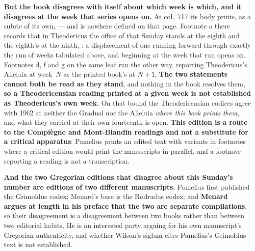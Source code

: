 \textbf{But the book disagrees with itself about which week is which, and it
disagrees at the week that series opens on.} At col.~717 its body prints, as a
rubric of its own,  --- and  is nowhere defined on
that page. Footnote a there records that in Theodericus the office of that
Sunday stands at the eighth and the eighth's at the ninth, : a displacement of one running forward through exactly the run of
weeks tabulated above, and beginning at the week that run opens on. Footnotes
d, f and g on the same leaf run the other way, reporting Theodericus's Alleluia
at week~$N$ as the printed book's at $N{+}1$. \textbf{The two statements cannot
both be read as they stand}, and nothing in the book resolves them, \textbf{so a
Theodericensian reading printed at a given week is not established as
Theodericus's own week.} On that bound the Theodericensian codices agree with
1962 at neither the Gradual nor the Alleluia \emph{where this book prints
them}, and what they carried at their own fourteenth is open.
\textbf{This edition is a route to the Compiègne and
Mont-Blandin readings and not a substitute for a critical apparatus}: Pamelius
prints an edited text with variants in footnotes where a critical edition would
print the manuscripts in parallel, and a footnote reporting a reading is not a
transcription.

\textbf{And the two Gregorian editions that disagree about this Sunday's number
are editions of two different manuscripts.} Pamelius first published the
Grimoldus codex; Menard's base is the Rodradus codex; and \textbf{Menard argues
at length in his preface that the two are separate compilations}, so their
disagreement is a disagreement between two books rather than between two
editorial habits. He is an interested party arguing for his own manuscript's
Gregorian authenticity, and whether Wilson's siglum  cites
Pamelius's Grimoldus text is not established.

